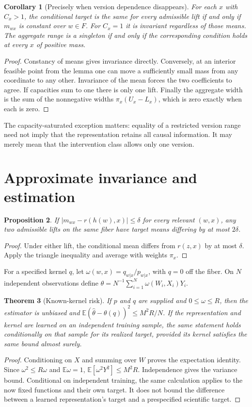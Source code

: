 \documentclass[11pt,a4paper]{article}
\newtheorem{theorem}{Theorem}[section]
\newtheorem{proposition}[theorem]{Proposition}
\newtheorem{corollary}[theorem]{Corollary}
\theoremstyle{definition}
\theoremstyle{remark}
\newcommand{\E}{\mathbb{E}}
\begin{document}
\begin{corollary}[Precisely when version dependence disappears]
For each $x$ with $C_x>1$, the conditional target is the same for every admissible lift if and only if $m_{wx}$ is constant over $w\in F$. For $C_x=1$ it is invariant regardless of those means. The aggregate range is a singleton if and only if the corresponding condition holds at every $x$ of positive mass.
\end{corollary}
\begin{proof}
Constancy of means gives invariance directly. Conversely, at an interior feasible point from the lemma one can move a sufficiently small mass from any coordinate to any other. Invariance of the mean forces the two coefficients to agree. If capacities sum to one there is only one lift. Finally the aggregate width is the sum of the nonnegative widths $\pi_x(U_x-L_x)$, which is zero exactly when each is zero.
\end{proof}
The capacity-saturated exception matters: equality of a restricted version range need not imply that the representation retains all causal information. It may merely mean that the intervention class allows only one version.
\section{Approximate invariance and estimation}
\begin{proposition}
If $|m_{wx}-r(h(w),x)|\le\delta$ for every relevant $(w,x)$, any two admissible lifts on the same fiber have target means differing by at most $2\delta$.
\end{proposition}
\begin{proof}
Under either lift, the conditional mean differs from $r(z,x)$ by at most $\delta$. Apply the triangle inequality and average with weights $\pi_x$.
\end{proof}
For a specified kernel $q$, let $\omega(w,x)=q_{w|x}/p_{w|x}$, with $q=0$ off the fiber. On $N$ independent observations define
$\widehat\theta=N^{-1}\sum_{i=1}^N\omega(W_i,X_i)Y_i$.
\begin{theorem}[Known-kernel risk]
If $p$ and $q$ are supplied and $0\le\omega\le R$, then the estimator is unbiased and
$\E(\widehat\theta-\theta(q))^2\le M^2R/N$.
If the representation and kernel are learned on an independent training sample, the same statement holds conditionally on that sample for its realized target, provided its kernel satisfies the same bound almost surely.
\end{theorem}
\begin{proof}
Conditioning on $X$ and summing over $W$ proves the expectation identity. Since $\omega^2\le R\omega$ and $\E\omega=1$,
$\E[\omega^2Y^2]\le M^2R$.
Independence gives the variance bound. Conditional on independent training, the same calculation applies to the now fixed functions and their own target. It does not bound the difference between a learned representation's target and a prespecified scientific target.
\end{proof}
\end{document}
